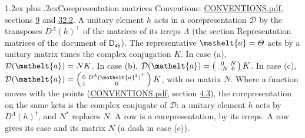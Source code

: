 \documentclass[10pt,a4paper]{article}
\makeatletter
\renewcommand\section{\@startsection{section}{1}{\z@}{-3ex plus -1ex minus -.2ex}%
  {1.2ex plus .2ex}{\normalfont\large\sffamily\bfseries\color{parttitle}}}
\numberwithin{equation}{section}
\newcommand{\eltfont}[1]{{\let\sigma\eltsigma\mathelt{#1}}}
\newcommand{\grp}[1]{\mathsf{#1}}
\newcommand{\elt}[1]{\eltfont{#1}}
\makeatother
\begin{document}
\section{Corepresentation matrices}\label{s:corep_matrices}
Conventions: \href{../../CONVENTIONS.pdf}{CONVENTIONS.pdf}, sections \href{../../../rotation/CONVENTIONS.pdf\#conv.9}{9} and \href{../../CONVENTIONS.pdf\#conv.32.2}{32.2}.
A unitary element $h$ acts in a corepresentation $\mathcal{D}$ by the transposes $D^{\Lambda}(h)^{\top}$ of the matrices of its irreps $\Lambda$ (the section Representation matrices of the document of \href{../../../rotation/data/pdf/D4h.pdf}{$\grp{D_{4h}}$}). The representative $\elt{a} = \varTheta$ acts by a unitary matrix times the complex conjugation $K$.
In case (a), $\mathcal{D}(\elt{a}) = NK$. In case (b), $\mathcal{D}(\elt{a}) = \left(\begin{smallmatrix} 0 & N \\ -N & 0 \end{smallmatrix}\right) K$. In case (c), $\mathcal{D}(\elt{a}) = \left(\begin{smallmatrix} 0 & D^{\Lambda}(\elt{a}^2)^{\top} \\ 1 & 0 \end{smallmatrix}\right) K$, with no matrix $N$.
Where a function moves with the points (\href{../../CONVENTIONS.pdf}{CONVENTIONS.pdf}, section \href{../../../rotation/CONVENTIONS.pdf\#conv.4.3}{4.3}), the corepresentation on the same kets is the complex conjugate of $\mathcal{D}$: a unitary element $h$ acts by $D^{\Lambda}(h)^{\dagger}$, and $N^{*}$ replaces $N$.
A row is a corepresentation, by its irreps. A row gives its case and its matrix $N$ (a dash in case (c)).
\end{document}
